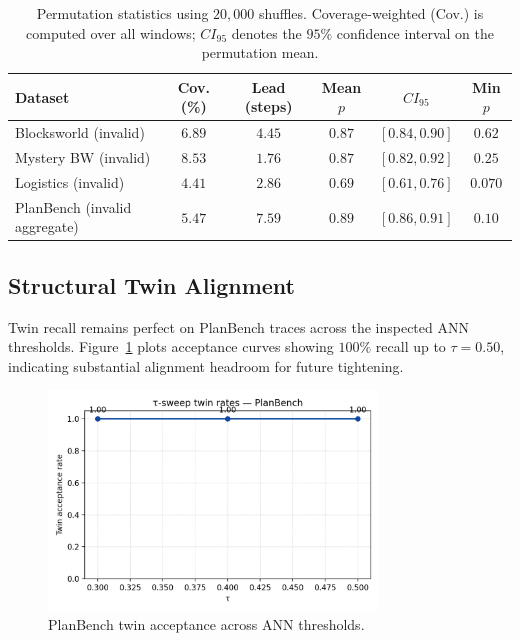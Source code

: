 \documentclass[11pt]{article}
\begin{document}
\begin{table}[h]
  \centering
  \caption{Permutation statistics using $20{,}000$ shuffles. Coverage-weighted (Cov.) is computed over all windows; $CI_{95}$ denotes the $95\%$ confidence interval on the permutation mean.}
  \label{tab:permutation}
  \begin{tabular}{lccccc}
    \toprule
    Dataset & Cov. (\%) & Lead (steps) & Mean $p$ & $CI_{95}$ & Min $p$ \\
    \midrule
    Blocksworld (invalid) & $6.89$ & $4.45$ & $0.87$ & $[0.84, 0.90]$ & $0.62$ \\
    Mystery BW (invalid) & $8.53$ & $1.76$ & $0.87$ & $[0.82, 0.92]$ & $0.25$ \\
    Logistics (invalid) & $4.41$ & $2.86$ & $0.69$ & $[0.61, 0.76]$ & $0.070$ \\
    PlanBench (invalid aggregate) & $5.47$ & $7.59$ & $0.89$ & $[0.86, 0.91]$ & $0.10$ \\
    \bottomrule
  \end{tabular}
\end{table}

\subsection{Structural Twin Alignment}
Twin recall remains perfect on PlanBench traces across the inspected ANN
thresholds. Figure~\ref{fig:tau-planbench} plots acceptance curves showing $100\%$
recall up to $\tau=0.50$, indicating substantial alignment headroom for future
tightening.

\begin{figure}[h]
  \centering
  \includegraphics[width=0.78\textwidth]{../note/fig_tau_sweep_planbench.png}
  \caption{PlanBench twin acceptance across ANN thresholds.}
  \label{fig:tau-planbench}
\end{figure}
\end{document}
